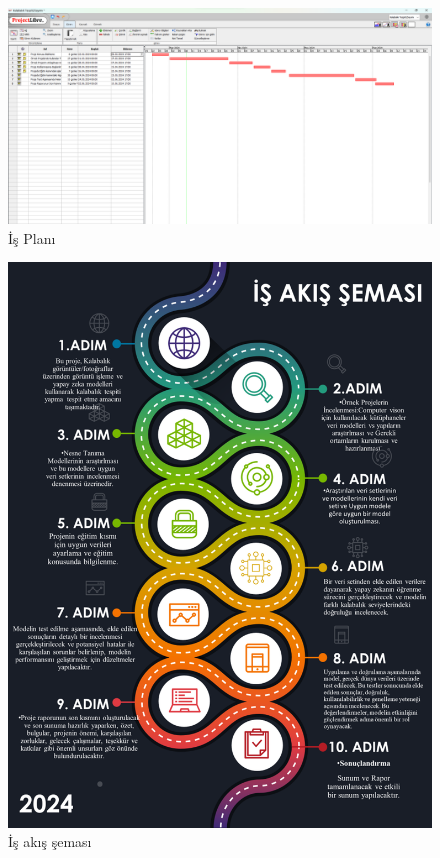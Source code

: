 \documentclass[10pt,a4paper]{report}
\begin{document}
		
		\begin{landscape}
					\begin{figure}[!h]
				
				\raggedright
				\includegraphics[height=\textheight]{GanttChart.png}
				\caption{İş Planı}
				\label{GanttChart}
			\end{figure}
		\end{landscape}
		
		\newpage
\begin{figure}[!h]
	\centering
	\begin{adjustbox}{width=\textwidth}
		\includegraphics{resim1.png}
	\end{adjustbox}
	\caption{İş akış şeması}
	\label{resim1}
\end{figure}
	\newpage
		
\end{document}

